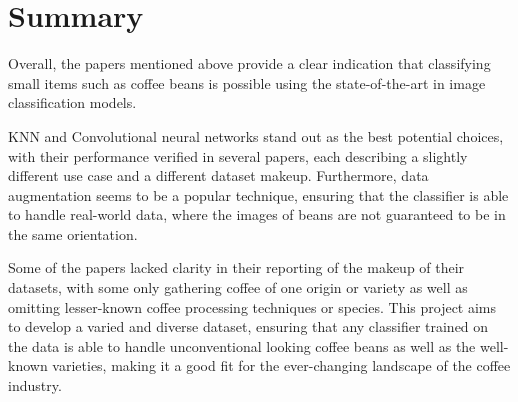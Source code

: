 \section{Summary}
\label{sec:lit-review-summary} Overall, the papers mentioned above provide a
clear indication that classifying small items such as coffee beans is possible
using the state-of-the-art in image classification models.

KNN and Convolutional neural networks stand out as the best potential choices, with
their performance verified in several papers, each describing a slightly
different use case and a different dataset makeup. Furthermore, data
augmentation seems to be a popular technique, ensuring that the classifier is able
to handle real-world data, where the images of beans are not guaranteed to be in
the same orientation.

Some of the papers lacked clarity in their reporting of the makeup of their
datasets, with some only gathering coffee of one origin or variety as well as omitting
lesser-known coffee processing techniques or species. This project aims to
develop a varied and diverse dataset, ensuring that any classifier trained on the
data is able to handle unconventional looking coffee beans as well as the well-known
varieties, making it a good fit for the ever-changing landscape of the coffee
industry.